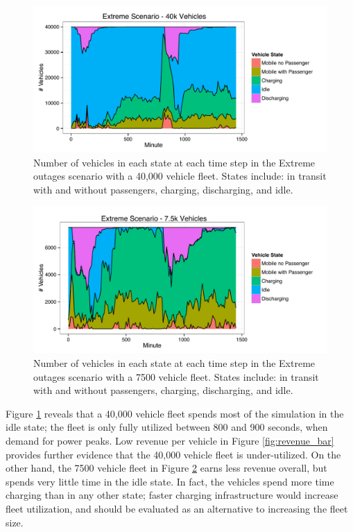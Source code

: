 \documentclass[journal]{IEEEtran}
\begin{document}
\begin{figure}[!htbp]
  \includegraphics[width=\linewidth]{plots/states-area-40k.pdf}
  \caption{Number of vehicles in each state at each time step in the Extreme outages scenario with a 40,000 vehicle fleet. States include: in transit with and without passengers, charging, discharging, and idle.}
  \label{fig:time_extreme_40k}
\end{figure}

\begin{figure}[!htbp]
  \includegraphics[width=\linewidth]{plots/states-area-7500.pdf}
  \caption{Number of vehicles in each state at each time step in the Extreme outages scenario with a 7500 vehicle fleet. States include: in transit with and without passengers, charging, discharging, and idle.}
  \label{fig:time_extreme_7500}
\end{figure}

Figure \ref{fig:time_extreme_40k} reveals that a 40,000 vehicle fleet spends most of the simulation in the idle state; the fleet is only fully utilized between 800 and 900 seconds, when demand for power peaks. Low revenue per vehicle in Figure \ref{fig:revenue_bar} provides further evidence that the 40,000 vehicle fleet is under-utilized. On the other hand, the 7500 vehicle fleet in Figure \ref{fig:time_extreme_7500} earns less revenue overall, but spends very little time in the idle state. In fact, the vehicles spend more time charging than in any other state; faster charging infrastructure would increase fleet utilization, and should be evaluated as an alternative to increasing the fleet size.
\end{document}
